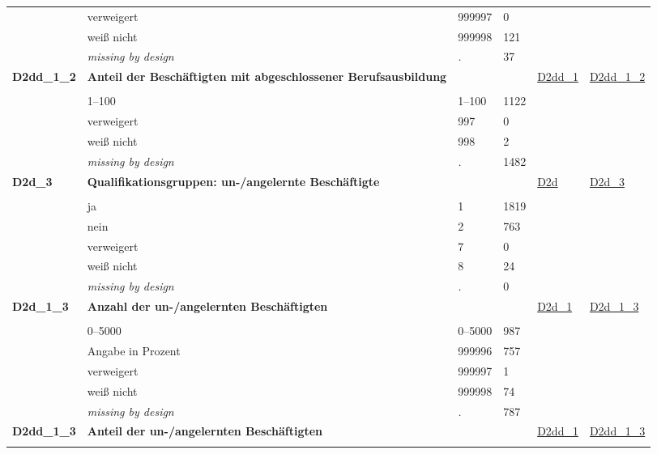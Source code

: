 \begin{longtable}{| L{2.45cm} | L{6cm} | C{1.5cm} | R{1cm} | C{2.25cm} | C{2.25cm} |}
   & verweigert & 999997 & 0 &  &  \\ 
   & weiß nicht & 999998 & 121 &  &  \\ 
   & \textit{missing by design} & \textit{.} & 37 &  &  \\ 
   \midrule
\textbf{D2dd\_1\_2}\label{var:D2dd:1:2} & \textbf{Anteil der Beschäftigten mit abgeschlossener Berufsausbildung} &  &  & \hyperref[D2dd:1]{D2dd\_1} & \hyperref[var:suf:D2dd:1:2]{D2dd\_1\_2} \\ 
   &  &  &  &  &  \\ 
   & 1--100 & 1--100 & 1122 &  &  \\ 
   & verweigert & 997 & 0 &  &  \\ 
   & weiß nicht & 998 & 2 &  &  \\ 
   & \textit{missing by design} & \textit{.} & 1482 &  &  \\ 
   \midrule
\textbf{D2d\_3}\label{var:D2d:3} & \textbf{Qualifikationsgruppen: un-/angelernte Beschäftigte} &  &  & \hyperref[D2d]{D2d} & \hyperref[var:suf:D2d:3]{D2d\_3} \\ 
   &  &  &  &  &  \\ 
   & ja & 1 & 1819 &  &  \\ 
   & nein & 2 & 763 &  &  \\ 
   & verweigert & 7 & 0 &  &  \\ 
   & weiß nicht & 8 & 24 &  &  \\ 
   & \textit{missing by design} & \textit{.} & 0 &  &  \\ 
   \midrule
\textbf{D2d\_1\_3}\label{var:D2d:1:3} & \textbf{Anzahl der un-/angelernten Beschäftigten} &  &  & \hyperref[D2d:1]{D2d\_1} & \hyperref[var:suf:D2d:1:3]{D2d\_1\_3} \\ 
   &  &  &  &  &  \\ 
   & 0--5000 & 0--5000 & 987 &  &  \\ 
   & Angabe in Prozent & 999996 & 757 &  &  \\ 
   & verweigert & 999997 & 1 &  &  \\ 
   & weiß nicht & 999998 & 74 &  &  \\ 
   & \textit{missing by design} & \textit{.} & 787 &  &  \\ 
   \midrule
\textbf{D2dd\_1\_3}\label{var:D2dd:1:3} & \textbf{Anteil der un-/angelernten Beschäftigten} &  &  & \hyperref[D2dd:1]{D2dd\_1} & \hyperref[var:suf:D2dd:1:3]{D2dd\_1\_3} \\ 
   &  &  &  &  &  \\ 

\end{longtable}
